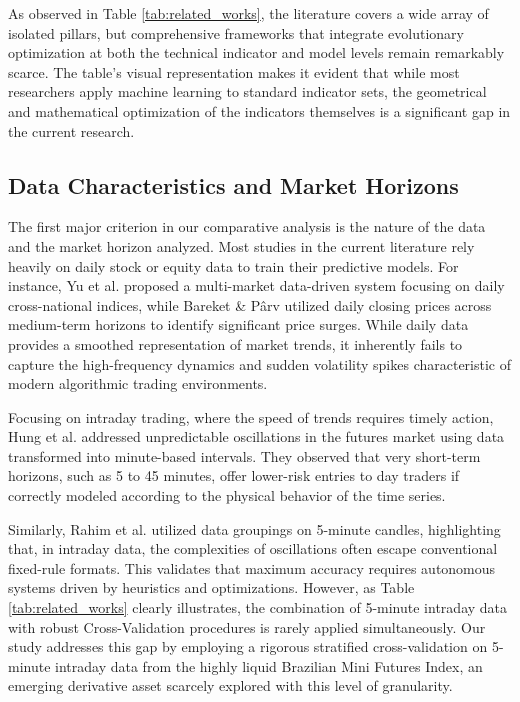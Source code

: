 \documentclass{ieeeaccess}
\begin{document}
As observed in Table \ref{tab:related_works}, the literature covers a wide array of isolated pillars, but comprehensive frameworks that integrate evolutionary optimization at both the technical indicator and model levels remain remarkably scarce. The table's visual representation makes it evident that while most researchers apply machine learning to standard indicator sets, the geometrical and mathematical optimization of the indicators themselves is a significant gap in the current research.

\subsection{Data Characteristics and Market Horizons}

The first major criterion in our comparative analysis is the nature of the data and the market horizon analyzed. Most studies in the current literature rely heavily on daily stock or equity data to train their predictive models. For instance, Yu et al. \cite{yu2025multi} proposed a multi-market data-driven system focusing on daily cross-national indices, while Bareket \& Pârv \cite{bareket2024adaptive} utilized daily closing prices across medium-term horizons to identify significant price surges. While daily data provides a smoothed representation of market trends, it inherently fails to capture the high-frequency dynamics and sudden volatility spikes characteristic of modern algorithmic trading environments.

Focusing on intraday trading, where the speed of trends requires timely action, Hung et al. \cite{hung2024ai} addressed unpredictable oscillations in the futures market using data transformed into minute-based intervals. They observed that very short-term horizons, such as 5 to 45 minutes, offer lower-risk entries to day traders if correctly modeled according to the physical behavior of the time series.

Similarly, Rahim et al. \cite{rahim2025technical} utilized data groupings on 5-minute candles, highlighting that, in intraday data, the complexities of oscillations often escape conventional fixed-rule formats. This validates that maximum accuracy requires autonomous systems driven by heuristics and optimizations. However, as Table \ref{tab:related_works} clearly illustrates, the combination of 5-minute intraday data with robust Cross-Validation procedures is rarely applied simultaneously. Our study addresses this gap by employing a rigorous stratified cross-validation on 5-minute intraday data from the highly liquid Brazilian Mini Futures Index, an emerging derivative asset scarcely explored with this level of granularity.
\end{document}
